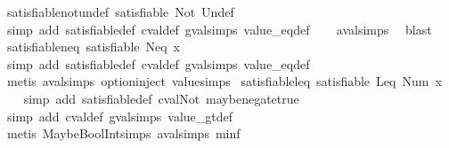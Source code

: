 \begin{isabellebody}
\isamarkupfalse%
\ satisfiable{\isacharunderscore}not{\isacharunderscore}undef{\isacharcolon}\ {\isachardoublequoteopen}satisfiable\ {\isacharparenleft}Not\ {\isacharparenleft}Undef{\isacharparenright}{\isacharparenright}{\isachardoublequoteclose}\isanewline
%
\isadelimproof
\ \ %
\endisadelimproof
%
\isatagproof
{}\isamarkupfalse%
\ {\isacharparenleft}simp\ add{\isacharcolon}\ satisfiable{\isacharunderscore}def\ cval{\isacharunderscore}def\ gval{\isachardot}simps\ value_eq{\isacharunderscore}def{\isacharparenright}\isanewline
\ \ \isamarkupfalse%
\ aval{\isachardot}simps{\isacharparenleft}{}{\isacharparenright}\ \isamarkupfalse%
\ blast%
\endisatagproof
{\isafoldproof}%
%
\isadelimproof
\isanewline
%
\endisadelimproof
\isanewline
{}\isamarkupfalse%
\ satisfiable{\isacharunderscore}neq{\isacharcolon}\ {\isachardoublequoteopen}satisfiable\ {\isacharparenleft}Neq\ x{}{\isacharparenright}{\isachardoublequoteclose}\isanewline
%
\isadelimproof
\ \ %
\endisadelimproof
%
\isatagproof
{}\isamarkupfalse%
\ {\isacharparenleft}simp\ add{\isacharcolon}\ satisfiable{\isacharunderscore}def\ cval{\isacharunderscore}def\ gval{\isachardot}simps\ value_eq{\isacharunderscore}def{\isacharparenright}\isanewline
\ \ \isamarkupfalse%
\ {\isacharparenleft}metis\ aval{\isachardot}simps{\isacharparenleft}{}{\isacharparenright}\ option{\isachardot}inject\ value{\isachardot}simps{\isacharparenleft}{}{\isacharparenright}{\isacharparenright}%
\endisatagproof
{\isafoldproof}%
%
\isadelimproof
\isanewline
%
\endisadelimproof
\isanewline
{}\isamarkupfalse%
\ satisfiable{\isacharunderscore}leq{\isacharcolon}\ {\isachardoublequoteopen}satisfiable\ {\isacharparenleft}Leq\ {\isacharparenleft}Num\ x{\isacharparenright}{\isacharparenright}{\isachardoublequoteclose}\isanewline
%
\isadelimproof
\ \ %
\endisadelimproof
%
\isatagproof
{}\isamarkupfalse%
\ {\isacharparenleft}simp\ add{\isacharcolon}\ satisfiable{\isacharunderscore}def\ cval{\isacharunderscore}Not\ maybe{\isacharunderscore}negate{\isacharunderscore}true{\isacharparenright}\isanewline
\ \ \isamarkupfalse%
\ {\isacharparenleft}simp\ add{\isacharcolon}\ cval{\isacharunderscore}def\ gval{\isachardot}simps\ value_gt{\isacharunderscore}def{\isacharparenright}\isanewline
\ \ \isamarkupfalse%
\ {\isacharparenleft}metis\ MaybeBoolInt{\isachardot}simps{\isacharparenleft}{}{\isacharparenright}\ aval{\isachardot}simps{\isacharparenleft}{}{\isacharparenright}\ minf{\isacharparenleft}{}{\isacharparenright}{\isacharparenright}%

\end{isabellebody}
